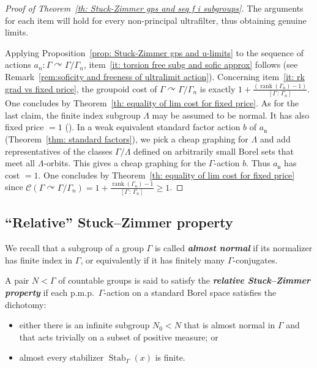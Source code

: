 \documentclass[AHL,Unicode,longabstracts,published]{cedram}
\newcommand{\defin}[1]{\textbf{\emph{#1}}}
\newcommand{\acting}{\curvearrowright}
\newcommand{\cost}{\mathcal{C}}
\DeclareMathOperator{\rank}{rank}
\DeclareMathOperator{\Stab}{Stab}
\newcommand{\ul}{\mathfrak{u}}
\newcommand{\pmp}{p.m.p.\ }
\begin{document}
\begin{proof}[Proof of Theorem~\ref{th: Stuck-Zimmer gps and seq f i subgroups}]
The arguments for each item will hold for every non-principal ultrafilter, thus obtaining genuine limits.

Applying Proposition~\ref{prop: Stuck-Zimmer gps and u-limits} to the sequence of actions $a_n:\Gamma\acting \Gamma/\Gamma_n$, item~\eqref{it: torsion free subg and sofic approx} follows (see Remark~\ref{rem:soficity and freeness of ultralimit action}). Concerning item~\eqref{it: rk grad vs fixed price}, the groupoid cost of $\Gamma\acting \Gamma/\Gamma_n$ is exactly $1+ \frac{(\rank (\Gamma_n)-1)}{[\Gamma\,:\,\Gamma_n]}$. One concludes by Theorem~\ref{th: equality of lim cost for fixed price}. As for the last claim, the finite index subgroup $\Lambda$ may be assumed to be normal. It has also fixed price $=1$ (\cite{Gab-cost}). In a weak equivalent standard factor action $b$ of $a_{\ul}$ (Theorem~\ref{thm: standard factors}), we pick a cheap graphing for $\Lambda$ and add representatives of the classes $\Gamma/\Lambda$ defined on arbitrarily small Borel sets that meet all $\Lambda$-orbits. This gives a cheap graphing for the $\Gamma$-action $b$. Thus $a_{\ul}$ has cost $=1$. One concludes by Theorem~\ref{th: equality of lim cost for fixed price} since $\cost(\Gamma\acting \Gamma/\Gamma_n)=1+\frac{\rank (\Gamma_n)-1 }{ [\Gamma\,:\,\Gamma_n]}\geq 1$.
\end{proof}



\subsection{``Relative'' Stuck--Zimmer property}

We recall that a subgroup of a group $\Gamma$ is called
\defin{almost normal} if its normalizer has finite index in $\Gamma$, or equivalently if it has finitely many $\Gamma$-conjugates.



A pair $N<\Gamma$ of countable groups is said to satisfy the
\defin{relative Stuck--Zimmer property} if each \pmp $\Gamma$-action on a standard Borel space satisfies the dichotomy:
\begin{itemize}
\item[--] either there is an infinite subgroup $N_0 < N$ that is almost normal in $\Gamma$ and that acts trivially on a subset of positive measure; or
\item[--] almost every stabilizer $\Stab_{\Gamma}(x)$ is finite.
\end{itemize}
\end{document}
